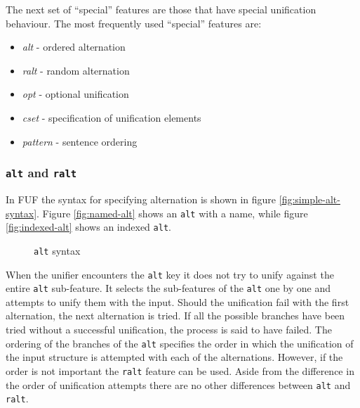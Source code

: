 \documentclass[12pt]{article}
\begin{document}
{The next set of ``special'' features are those that have special unification behaviour. 
The most frequently used ``special'' features are:
\begin{itemize}
    \item \textit{alt} - ordered alternation
    \item \textit{ralt} - random alternation
    \item \textit{opt} - optional unification
    \item \textit{cset} - specification of unification elements
    \item \textit{pattern} - sentence ordering
\end{itemize}

\subsubsection{\texttt{alt} and \texttt{ralt}}

In FUF the syntax for specifying alternation is shown in figure \ref{fig:simple-alt-syntax}. 
Figure \ref{fig:named-alt} shows an \texttt{alt} with a name, while figure \ref{fig:indexed-alt} 
shows an indexed \texttt{alt}.
\begin{figure}[h1]
    \centering
{\scriptsize
{}
}
\caption{\texttt{alt} syntax}
\label{fig:alt-syntax}
\end{figure}


When the unifier encounters the \texttt{alt} key it does not try to unify against the entire
\texttt{alt} sub-feature. It selects the sub-features of the \texttt{alt} one by one
and attempts to unify them with the input. Should the unification fail with the first alternation,
the next alternation is tried. If all the possible branches have been tried without a successful
unification, the process is said to have failed.
The ordering of the branches of the \texttt{alt} specifies the order in which the unification
of the input structure is attempted with each of the alternations.
However, if the order is not important the \texttt{ralt} feature can be used. Aside from the
difference in the order of unification attempts there are no other differences between \texttt{alt}
and \texttt{ralt}.

}
\end{document}
